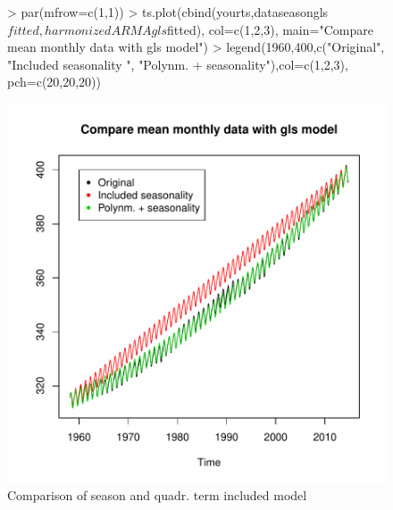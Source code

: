 \documentclass[11pt, a4paper]{article} %
\begin{document}
\begin{figure}[H]
\centering
\begin{Schunk}
\begin{Sinput}
> par(mfrow=c(1,1))
> ts.plot(cbind(yourts,dataseasongls$fitted, harmonizedARMAgls$fitted), col=c(1,2,3),
         main="Compare mean monthly data with gls model")
> legend(1960,400,c("Original", "Included seasonality ",
                   "Polynm. + seasonality"),col=c(1,2,3), pch=c(20,20,20))
\end{Sinput}
\end{Schunk}
\includegraphics{alleselena-041}
\caption{Comparison of season and quadr. term included model}
\label{compq}
\end{figure}
\end{document}
